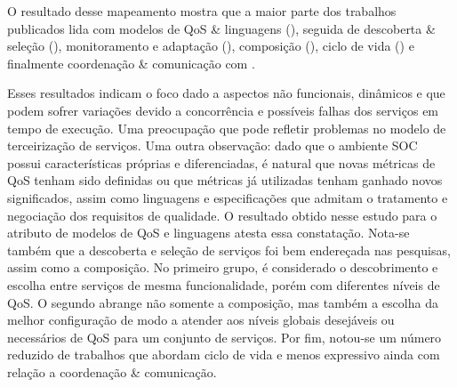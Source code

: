 O resultado desse mapeamento mostra que a maior parte dos trabalhos publicados lida com modelos de QoS \& linguagens (\ModelosdeQoSeLinguagens), seguida de descoberta \& sele\c{c}\~{a}o (\DescobrimentoeSelecao), monitoramento e adapta\c{c}\~{a}o (\MonitoramentoAdaptacao), composi\c{c}\~{a}o (\Composicao), ciclo de vida (\Ciclodevida) e finalmente coordenação \& comunicação com \CoordenacaoeComunicacao.

Esses resultados indicam o foco dado a aspectos não funcionais, dinâmicos e que podem sofrer variações devido a concorrência e poss\'{i}veis falhas dos servi\c{c}os em tempo de execu\c{c}\~{a}o. Uma preocupa\c{c}\~{a}o que pode refletir problemas no modelo de terceirização de serviços. Uma outra observa\c{c}\~{a}o: dado que o ambiente SOC possui características próprias e diferenciadas, é natural que novas métricas de QoS tenham sido definidas ou que métricas já utilizadas tenham ganhado novos significados, assim como linguagens e especificações que admitam o tratamento e negociação dos requisitos de qualidade. O resultado obtido nesse estudo para o atributo de modelos de QoS e linguagens atesta essa constatação. Nota-se também que a descoberta e seleção de serviços foi bem endereçada nas pesquisas, assim como a composição. No primeiro grupo, é considerado o descobrimento e escolha entre serviços de mesma funcionalidade, porém com diferentes níveis de QoS. O segundo abrange não somente a composição, mas 
também a escolha da melhor configuração de modo a atender aos níveis globais desejáveis ou necessários de QoS para um conjunto de serviços. Por fim, notou-se um número reduzido de trabalhos que abordam ciclo de vida e menos expressivo ainda com rela\c{c}\~{a}o a coordenação \& comunicação. 